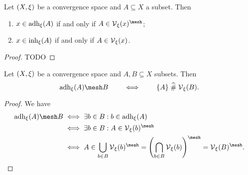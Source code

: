 \begin{proposition} \label{principalAdherenceInherence}
Let $\left( X,\xi \right)$ be a convergence space and $A\subseteq X$ a subset. Then
\begin{enumerate}
\item $x\in \operatorname{adh}_\xi(A)$ \textup{if and only if} $A\in \vicinity_\xi(x)^{\mesh}$;
\item $x\in \operatorname{inh}_\xi(A)$ \textup{if and only if} $A\in \operatorname{\mathcal{V}}_\xi(x)$.
\end{enumerate}
\end{proposition}
\begin{proof}
TODO
\end{proof}
\begin{corollary} \label{setAdherenceInherence}
Let $\left( X,\xi \right)$ be a convergence space and $A,B\subseteq X$ subsets. Then
\[ \adh_\xi(A) \mesh B \qquad\iff\qquad \{A\} \amesh \vicinity_\xi(B). \]
\end{corollary}
\begin{proof}
We have
\begin{align*}
\adh_\xi(A) \mesh B &\iff \exists b\in B: b\in \adh_\xi(A) \\
&\iff \exists b\in B: A\in \vicinity_\xi(b)^{\mesh} \\
&\iff A \in \bigcup_{b\in B}\vicinity_\xi(b)^{\mesh} = \left(\bigcap_{b\in B}\vicinity_\xi(b)\right)^{\mesh} = \vicinity_\xi(B)^{\mesh}.
\end{align*}
\end{proof}


